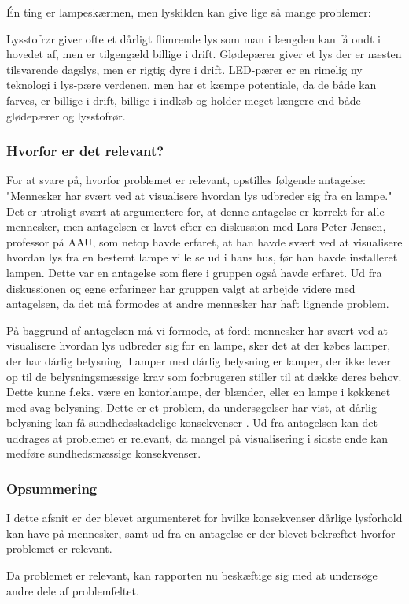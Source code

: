 Én ting er lampeskærmen, men lyskilden kan give lige så mange problemer:

Lysstofrør giver ofte et dårligt flimrende lys som man i længden kan få ondt i hovedet af, men er tilgengæld billige i drift\cite{videnskab_dk_led}. Glødepærer giver et lys der er næsten tilsvarende dagslys, men er rigtig dyre i drift\cite{videnskab_dk_led}. LED-pærer er en rimelig ny teknologi i lys-pære verdenen, men har et kæmpe potentiale, da de både kan farves, er billige i drift, billige i indkøb og holder meget længere end både glødepærer og lysstofrør\cite{videnskab_dk_led}.


\subsubsection{Hvorfor er det relevant?}
\label{sec:hvorfor_relavant}

For at svare på, hvorfor problemet er relevant, opstilles følgende antagelse: "Mennesker har svært ved at visualisere hvordan lys udbreder sig fra en lampe." Det er utroligt svært at argumentere for, at denne antagelse er korrekt for alle mennesker, men antagelsen er lavet efter en diskussion med Lars Peter Jensen, professor på AAU, som netop havde erfaret, at han havde svært ved at visualisere hvordan lys fra en bestemt lampe ville se ud i hans hus, før han havde installeret lampen. Dette var en antagelse som flere i gruppen også havde erfaret. Ud fra diskussionen og egne erfaringer har gruppen valgt at arbejde videre med antagelsen, da det må formodes at andre mennesker har haft lignende problem. 

På baggrund af antagelsen må vi formode, at fordi mennesker har svært ved at visualisere hvordan lys udbreder sig for en lampe, sker det at der købes lamper, der har dårlig belysning. Lamper med dårlig belysning er lamper, der ikke lever op til de belysningsmæssige krav som forbrugeren stiller til at dække deres behov. Dette kunne f.eks. være en kontorlampe, der blænder, eller en lampe i køkkenet med svag belysning. Dette er et problem, da undersøgelser har vist, at dårlig belysning kan få sundhedsskadelige konsekvenser \cite{lys_konsekvenser}. Ud fra antagelsen kan det  uddrages at problemet er relevant, da mangel på visualisering i sidste ende kan medføre sundhedsmæssige konsekvenser.

\subsubsection{Opsummering}
I dette afsnit er der blevet argumenteret for hvilke konsekvenser dårlige lysforhold kan have på mennesker, samt ud fra en antagelse er der blevet bekræftet hvorfor problemet er relevant. 

Da problemet er relevant, kan rapporten nu beskæftige sig med at undersøge andre dele af problemfeltet. 
